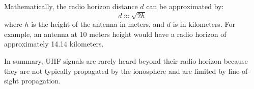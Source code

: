 Mathematically, the radio horizon distance \( d \) can be approximated by:
\[ d \approx \sqrt{2h} \]
where \( h \) is the height of the antenna in meters, and \( d \) is in kilometers. For example, an antenna at 10 meters height would have a radio horizon of approximately 14.14 kilometers.

In summary, UHF signals are rarely heard beyond their radio horizon because they are not typically propagated by the ionosphere and are limited by line-of-sight propagation.

